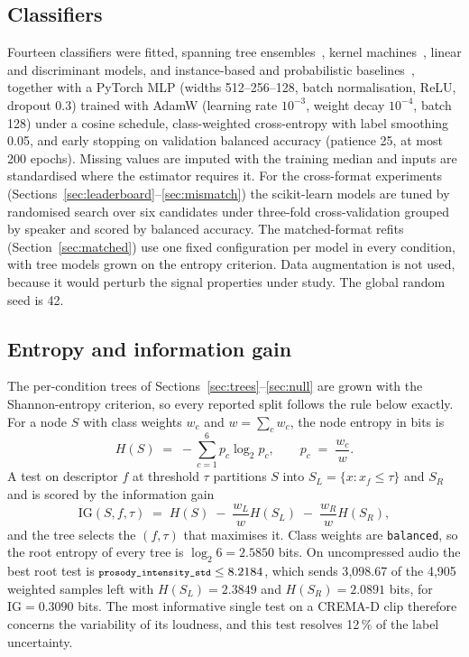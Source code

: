 \documentclass[lettersize,journal]{IEEEtran}
\newcommand{\ttf}[1]{\texttt{\footnotesize #1}}
\begin{document}
\subsection{Classifiers}
Fourteen classifiers were fitted, spanning tree
ensembles~\cite{breiman2001rf,chen2016xgboost}, kernel
machines~\cite{cortes1995svm}, linear and discriminant models, and
instance-based and probabilistic baselines~\cite{pedregosa2011sklearn},
together with a PyTorch MLP (widths 512--256--128, batch normalisation, ReLU, dropout 0.3)
trained with AdamW (learning rate $10^{-3}$, weight decay $10^{-4}$, batch 128)
under a cosine schedule, class-weighted cross-entropy with label smoothing
0.05, and early stopping on validation balanced accuracy (patience 25, at most
200 epochs). Missing values are imputed with the training median and inputs are
standardised where the estimator requires it. For the cross-format experiments
(Sections~\ref{sec:leaderboard}--\ref{sec:mismatch}) the scikit-learn models
are tuned by randomised search over six candidates under three-fold
cross-validation grouped by speaker and scored by balanced accuracy. The
matched-format refits (Section~\ref{sec:matched}) use one fixed configuration
per model in every condition, with tree models grown on the entropy criterion.
Data augmentation is not used, because it would perturb the signal properties
under study. The global random seed is 42.

\subsection{Entropy and information gain}
The per-condition trees of Sections~\ref{sec:trees}--\ref{sec:null} are grown
with the Shannon-entropy criterion, so every reported split follows the rule
below exactly. For a node $S$ with class weights $w_c$ and $w=\sum_c w_c$, the node
entropy in bits is
\begin{equation}\label{eq:entropy}
H(S) \;=\; -\sum_{c=1}^{6} p_c \log_2 p_c,
\qquad p_c \;=\; \frac{w_c}{w}.
\end{equation}
A test on descriptor $f$ at threshold $\tau$ partitions $S$ into
$S_L=\{x: x_f\leq\tau\}$ and $S_R$ and is scored by the information gain
\begin{equation}\label{eq:ig}
\mathrm{IG}(S,f,\tau) \;=\; H(S) \;-\; \frac{w_L}{w}H(S_L) \;-\; \frac{w_R}{w}H(S_R),
\end{equation}
and the tree selects the $(f,\tau)$ that maximises it. Class weights are
\texttt{balanced}, so the root entropy of every tree is
$\log_2 6=2.5850$ bits. On uncompressed audio the best root test is
$\ttf{prosody\_intensity\_std}\leq8.2184$, which sends 3{,}098.67 of the
4{,}905 weighted samples left with $H(S_L)=2.3849$ and $H(S_R)=2.0891$ bits,
for $\mathrm{IG}=0.3090$ bits. The most informative single test on a CREMA-D
clip therefore concerns the variability of its loudness, and this test resolves
12\,\% of the label uncertainty.
\end{document}
